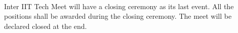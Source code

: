 
\paragraph{}
Inter IIT Tech Meet will have a closing ceremony as its last event. All the positions shall be awarded during the closing ceremony. The meet will be declared closed at the end.